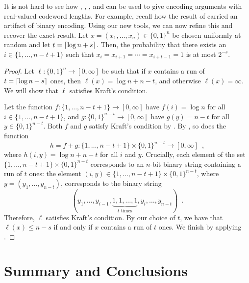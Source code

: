 \documentclass[format=acmsmall, review=false, screen=true]{acmart}
\newenvironment{customthm}[1]
  {\renewcommand\theinnercustomthm{#1}\innercustomthm}
  {\endinnercustomthm}
\begin{document}
It is not hard to see how , ,
, and  can be used to
give encoding arguments with real-valued codeword lengths. For
example, recall how the result of  carried an artifact
of binary encoding. Using our new tools, we can now refine this and
recover the exact result.
\begin{customthm}{\ref*{thm:runs-i}b}
  Let $x=(x_1,\ldots,x_n)\in\{0,1\}^n$ be chosen uniformly at random
  and let $t = {\lceil \log n + s \rceil}$. Then, the probability that there
  exists an $i\in\{1,\ldots,n-t+1\}$ such that
  $x_i=x_{i+1}=\cdots=x_{i+t-1}=1$ is at most $2^{-s}$.
\end{customthm}
\begin{proof}
  Let $\ell : \{0, 1\}^n \to [0, \infty]$ be such that if $x$ contains
  a run of $t = {\lceil \log n + s \rceil}$ ones, then
  $\ell(x) = \log n + n - t$, and otherwise $\ell(x) = \infty$. We
  will show that $\ell$ satisfies Kraft's condition.


  Let the function $f : \{1, \ldots, n - t + 1\} \to [0, \infty]$ have
  $f(i) = \log n$ for all $i \in \{1, \dots, n - t + 1\}$, and
  $g : \{0, 1\}^{n - t} \to [0, \infty]$ have $g(y) = n - t$ for all
  $y \in \{0, 1\}^{n - t}$. Both $f$ and $g$ satisfy Kraft's condition by
  . By , so does
  the function
  \[
    h = f + g : \{1, \ldots, n - t + 1\} \times \{0, 1\}^{n - t} \to
    [0, \infty] \enspace ,
  \]
  where $h(i, y) = \log n + n - t$ for all $i$ and $y$. Crucially,
  each element of the set $\{1, \ldots, n - t + 1\} \times \{0, 1\}^{n
    - t}$ corresponds to an $n$-bit binary string containing a run of
  $t$ ones: the element $(i, y) \in \{1, \ldots, n - t + 1\} \times
  \{0, 1\}^{n - t}$, where $y = (y_1, \ldots, y_{n - t})$, corresponds
  to the binary string
  \[
  (y_1, \dots, y_{i - 1}, \underbrace{1, 1, \dots, 1}_{\text{$t$ times}},
  y_i, \dots, y_{n - t}) \enspace .
  \]
  Therefore, $\ell$ satisfies Kraft's condition. By our choice of
  $t$, we have that $\ell(x) \leq n - s$ if and only if $x$ contains a
  run of $t$ ones. We finish by applying .
\end{proof}

\section{Summary and Conclusions}
\end{document}
